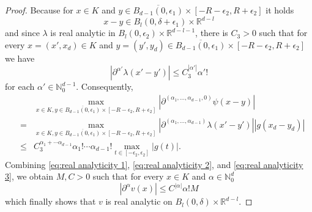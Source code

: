 \documentclass[10pt,a4paper]{amsart}
\newcommand{\N}{\mathbb{N}}
\newcommand{\R}{\mathbb{R}}
\begin{document}
\begin{proof}
	Because for $x\in K$ and $y\in \overline{B_{d-1}(0,\epsilon_1)}\times[-R-\epsilon_2,R+\epsilon_2]$ it holds
    \[x-y\in B_{l}(0,\delta+\epsilon_1)\times \R^{d-l}\]
	and since $\lambda$ is real analytic in $B_{l}(0,\epsilon_2)\times\R^{d-l-1}$, there is $C_3>0$ such that for every $x=(x',x_d)\in K$ and $y=(y',y_d)\in \overline{B_{d-1}(0,\epsilon_1)}\times[-R-\epsilon_2,R+\epsilon_2]$ we have
	$$|\partial^{\alpha'}\lambda(x'-y')|\leq C_3^{|\alpha'|}\alpha'!$$
	for each $\alpha'\in\N_0^{d-1}$. Consequently,
	\begin{eqnarray}\label{eq:real analyticity 3}
		&&\max_{x\in K, y\in \overline{B_{d-1}(0,\epsilon_1)}\times[-R-\epsilon_2,R+\epsilon_2]}\left|\partial^{(\alpha_1,\ldots,\alpha_{d-1},0)}\psi(x-y)\right|\nonumber\\
		&=&\max_{x\in K, y\in \overline{B_{d-1}(0,\epsilon_1)}\times[-R-\epsilon_2,R+\epsilon_2]}\left|\partial^{(\alpha_1,\ldots,\alpha_{d-1})}\lambda(x'-y')\right|\left|g(x_d-y_d)\right|\nonumber\\
		&\leq&C_3^{\alpha_1+\cdots\alpha_{d-1}}\alpha_1!\cdots\alpha_{d-1}!\max_{t\in [-\epsilon_2,\epsilon_2]} \left|g(t)\right|.
	\end{eqnarray}
	Combining \eqref{eq:real analyticity 1}, \eqref{eq:real analyticity 2}, and \eqref{eq:real analyticity 3}, we obtain $M, C>0$ such that for every $x\in K$ and $\alpha\in\N_0^d$
	\[|\partial^\alpha v(x)|\leq C^{|\alpha|}\alpha! M\]
	which finally shows that $v$ is real analytic on $B_{l}(0,\delta)\times\R^{d-l}$. 
\end{proof}
\end{document}
